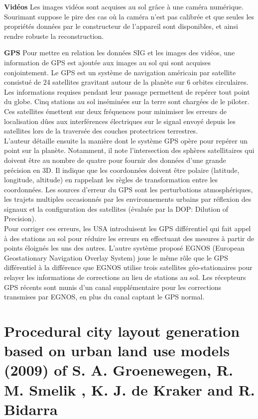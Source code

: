 \documentclass[11pt]{article}
\begin{document}
\textbf{Vidéos} Les images vidéos sont acquises au sol grâce à une caméra numérique. Sourimant suppose le pire des cas où la caméra n'est pas calibrée et que seules les propriétés données par le constructeur de l'appareil sont disponibles, et ainsi rendre robuste la reconstruction.

\textbf{GPS} Pour mettre en relation les données SIG et les images des vidéos, une information de GPS est ajoutée  aux images au sol qui sont acquises conjointement. Le GPS est un système de navigation américain par satellite consistué de 24 satellites gravitant autour de la planète sur 6 orbites circulaires. Les informations requises pendant leur passage permettent de repérer tout point du globe. Cinq stations au sol inséminées sur la terre sont chargées de le piloter. Ces satellites émettent sur deux fréquences pour minimiser les erreurs de localisation dûes aux interférences électriques sur le signal envoyé depuis les satellites lors de la traversée des couches protectrices terrestres. \\
L'auteur détaille ensuite la manière dont le système GPS opère pour repérer un point sur la planète. Notamment, il note l'intersection des sphères satellitaires qui doivent être au nombre de quatre pour fournir des données d'une grande précision en 3D. Il indique que les coordonnées doivent être polaire (latitude, longitude, altitude) en rappelant les règles de transformation entre les coordonnées. Les sources d'erreur du GPS sont les perturbations atmosphériques, les trajets multiples occasionnés par les environnements urbains par réflexion des signaux et la configuration des satellites (évaluée par la DOP: Dilution of Precision).\\
 Pour corriger ces erreurs, les USA introduisent les GPS différentiel qui fait appel à des stations au sol pour réduire les erreurs en effectuant des mesures à partir de points éloignés les uns des autres. L'autre système proposé EGNOS (European Geostationary Navigation Overlay System) joue le même rôle que le GPS différentiel à la différence que EGNOS utilise trois satellites géo-stationaires pour relayer les informations de corrections au lieu de stations au sol. Les récepteurs GPS récents sont munis d'un canal supplémentaire pour les corrections transmises par EGNOS, en plus du canal captant le GPS normal.


\section{Procedural city layout generation based on urban land use models (2009) of S. A. Groenewegen, R. M. Smelik , K. J. de Kraker and R. Bidarra}
\end{document}
